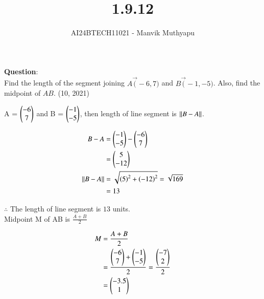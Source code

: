 \documentclass[journal,12pt,onecolumn]{IEEEtran}
\title{1.9.12}
\author{AI24BTECH11021 - Manvik Muthyapu}
\theoremstyle{remark}
\begin{document}


\maketitle
\bigskip

\renewcommand{\thefigure}{\theenumi}
\renewcommand{\thetable}{\theenumi}


\textbf{Question}:\\

Find the length of the segment joining $A\vec(-6,7)$ and $B\vec(-1,-5)$. Also, find the midpoint of $AB$.
\hfill (10, 2021)\\

\solution

A = $\begin{pmatrix}-6\\7\end{pmatrix}$ and B = $\begin{pmatrix}-1\\-5\end{pmatrix}$, then length of line segment is $\left\lVert B-A\right\rVert$.

\begin{align}
	B-A &= \begin{pmatrix}-1\\-5\end{pmatrix}-\begin{pmatrix}-6\\7\end{pmatrix}\\
            &= \begin{pmatrix}5\\-12\end{pmatrix}\\
	\left\lVert B-A\right\rVert &= \sqrt{\left(5\right)^2 + \left(-12\right)^2} = \sqrt{169}\\
	    &= 13
\end{align}

$\therefore$ The length of line segment is $13$ units.\\

Midpoint M of AB is $\frac{A+B}{2}$

\begin{align}
	M &= \frac{A+B}{2}\\
	  &= \frac{\begin{pmatrix}-6\\7\end{pmatrix} + \begin{pmatrix}-1\\-5\end{pmatrix}}{2} = \frac{\begin{pmatrix}-7\\2\end{pmatrix}}{2}\\
	  &= \begin{pmatrix}-3.5\\1\end{pmatrix}
\end{align}
\end{document}
